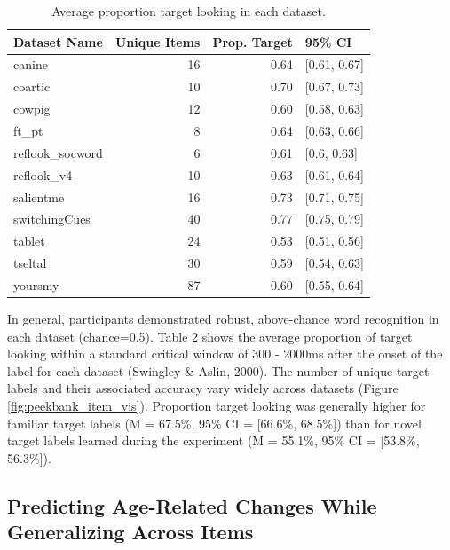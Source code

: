 \documentclass[10pt, letterpaper]{article}
\begin{document}
\begin{table}[H]
\centering
\begingroup\fontsize{9pt}{10pt}\selectfont
\begin{tabular}{lrrl}
  \hline
Dataset Name & Unique Items & Prop. Target & 95\% CI \\ 
  \hline
canine & 16 & 0.64 & [0.61, 0.67] \\ 
  coartic & 10 & 0.70 & [0.67, 0.73] \\ 
  cowpig & 12 & 0.60 & [0.58, 0.63] \\ 
  ft\_pt & 8 & 0.64 & [0.63, 0.66] \\ 
  reflook\_socword & 6 & 0.61 & [0.6, 0.63] \\ 
  reflook\_v4 & 10 & 0.63 & [0.61, 0.64] \\ 
  salientme & 16 & 0.73 & [0.71, 0.75] \\ 
  switchingCues & 40 & 0.77 & [0.75, 0.79] \\ 
  tablet & 24 & 0.53 & [0.51, 0.56] \\ 
  tseltal & 30 & 0.59 & [0.54, 0.63] \\ 
  yoursmy & 87 & 0.60 & [0.55, 0.64] \\ 
   \hline
\end{tabular}
\endgroup
\caption{Average proportion target looking in each dataset.} 
\end{table}

In general, participants demonstrated robust, above-chance word
recognition in each dataset (chance=0.5). Table 2 shows the average
proportion of target looking within a standard critical window of 300 -
2000ms after the onset of the label for each dataset (Swingley \& Aslin,
2000). The number of unique target labels and their associated accuracy
vary widely across datasets (Figure \ref{fig:peekbank_item_vis}).
Proportion target looking was generally higher for familiar target
labels (M = 67.5\%, 95\% CI = {[}66.6\%, 68.5\%{]}) than for novel
target labels learned during the experiment (M = 55.1\%, 95\% CI =
{[}53.8\%, 56.3\%{]}).

\hypertarget{predicting-age-related-changes-while-generalizing-across-items}{%
\subsection{Predicting Age-Related Changes While Generalizing Across
Items}\label{predicting-age-related-changes-while-generalizing-across-items}}
\end{document}
